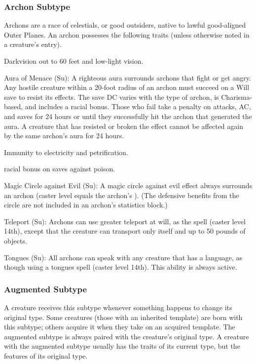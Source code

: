 \subsubsection{Archon Subtype} Archons are a race of celestials, or good outsiders, native to lawful good-aligned Outer Planes.
 An archon possesses the following traits (unless otherwise noted in a creature's entry).
\begin{itemize*}
\item Darkvision out to 60 feet and low-light vision.
\item Aura of Menace (Su): A righteous aura surrounds archons that fight or get angry. Any hostile creature within a 20-foot radius of an archon must succeed on a Will save to resist its effects. The save DC varies with the type of archon, is Charisma-based, and includes a  racial bonus. Those who fail take a  penalty on attacks, AC, and saves for 24 hours or until they successfully hit the archon that generated the aura. A creature that has resisted or broken the effect cannot be affected again by the same archon's aura for 24 hours.
\item Immunity to electricity and petrification.
\item  {} racial bonus on saves against poison.
\item Magic Circle against Evil (Su): A magic circle against evil effect always surrounds an archon (caster level equals the archon's ). (The defensive benefits from the circle are not included in an archon's statistics block.)
\item Teleport (Su): Archons can use greater teleport at will, as the spell (caster level 14th), except that the creature can transport only itself and up to 50 pounds of objects.
\item Tongues (Su): All archons can speak with any creature that has a language, as though using a tongues spell (caster level 14th). This ability is always active.
\end{itemize*}

\subsubsection{Augmented Subtype} A creature receives this subtype whenever something happens to change its original type. Some creatures (those with an inherited template) are born with this subtype; others acquire it when they take on an acquired template. The augmented subtype is always paired with the creature's original type. A creature with the augmented subtype usually has the traits of its current type, but the features of its original type.

